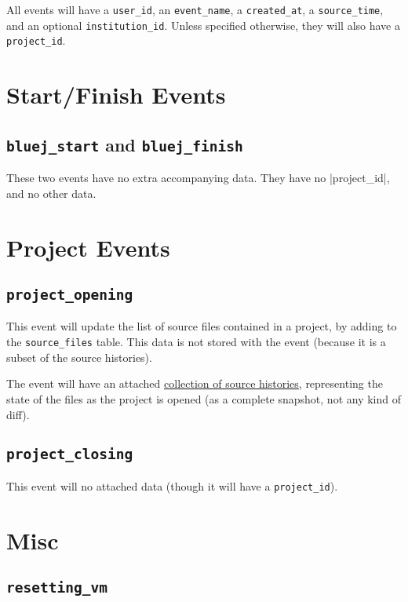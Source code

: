 \documentclass{book}
\begin{document}
All events will have a \texttt{user\_id}, an \texttt{event\_name}, a
\texttt{created\_at}, a \texttt{source\_time},
and an optional
\texttt{institution\_id}.  Unless specified otherwise, they will also have a \texttt{project\_id}.

\section{Start/Finish Events}

\subsection{\lstinline|bluej_start| and \lstinline|bluej_finish|}

These two events have no extra accompanying data.  They have no
|project_id|, and no other data.

\section{Project Events}

\subsection{\lstinline|project_opening|}

This event will update the list of source files contained in a project, by
adding to the \texttt{source\_files} table.  This data is not stored with the
event (because it is a subset of the source histories).

The event will have an attached \hyperref[tab:source_histories]{collection of
  source histories}, representing the state of the files as the project is
opened (as a complete snapshot, not any kind of diff).

\subsection{\lstinline|project_closing|}

This event will no attached data (though it will have a \texttt{project\_id}).

\section{Misc}

\subsection{\texttt{resetting\_vm}}
\end{document}
